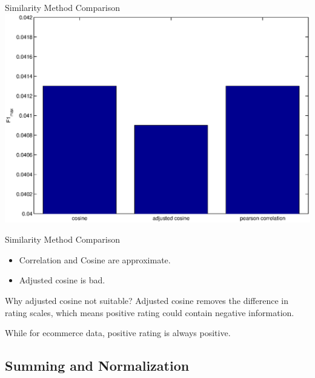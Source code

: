 \documentclass{beamer}
\begin{document}
\begin{frame}{Similarity Method Comparison}
\includegraphics[width=\linewidth]{./sim_compare_f1.eps}
\end{frame}


\begin{frame}{Similarity Method Comparison}

\begin{itemize}
\item Correlation and Cosine are approximate.
\item Adjusted cosine is bad.
\end{itemize}

\begin{exampleblock}{Why adjusted cosine not suitable?}
Adjusted cosine removes the difference in rating scales, which means positive rating could contain negative information.

While for ecommerce data, positive rating is always positive.
\end{exampleblock}

\end{frame}



\subsection{Summing and Normalization}
\end{document}
